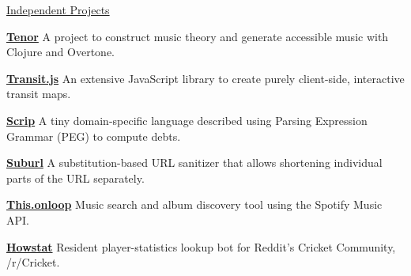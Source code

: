 \documentclass{resume} %
\begin{document}

\begin{rSection}{{\href{http://github.com/pranavrc/}{Independent Projects}}}

\item {\href{http://onloop.net/tenor/}{\bf Tenor}} A project to construct music theory and generate accessible music with Clojure and Overtone.
\item {\href{http://onloop.net/transit/}{\bf Transit.js}} An extensive JavaScript library to create purely client-side, interactive transit maps.
\item {\href{http://github.com/pranavrc/scrip/}{\bf Scrip}} A tiny domain-specific language described using Parsing Expression Grammar (PEG) to compute debts.
\item {\href{http://u.onloop.net/}{\bf Suburl}} A substitution-based URL sanitizer that allows shortening individual parts of the URL separately.
\item {\href{http://this.onloop.net/}{\bf This.onloop}} Music search and album discovery tool using the Spotify Music API.
\item {\href{http://redd.it/1i7lh3}{\bf Howstat}} Resident player-statistics lookup bot for Reddit's Cricket Community, /r/Cricket.

\end{rSection}


\iffalse
\end{document}
